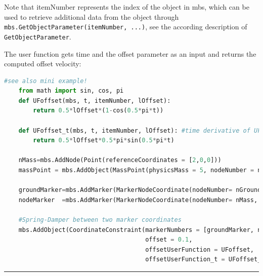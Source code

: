     Note that itemNumber represents the index of the object in mbs, which can be used to retrieve additional data from the object through
    \texttt{mbs.GetObjectParameter(itemNumber, ...)}, see the according description of \texttt{GetObjectParameter}.

    The user function gets time and the offset parameter as an input and returns the computed offset velocity:
    \finishTable
%
    \userFunctionExample{}
    \pythonstyle
    \begin{lstlisting}[language=Python]
    #see also mini example!
    from math import sin, cos, pi
    def UFoffset(mbs, t, itemNumber, lOffset): 
        return 0.5*lOffset*(1-cos(0.5*pi*t))
    
    def UFoffset_t(mbs, t, itemNumber, lOffset): #time derivative of UFoffset
        return 0.5*lOffset*0.5*pi*sin(0.5*pi*t)

    nMass=mbs.AddNode(Point(referenceCoordinates = [2,0,0]))
    massPoint = mbs.AddObject(MassPoint(physicsMass = 5, nodeNumber = nMass))
    
    groundMarker=mbs.AddMarker(MarkerNodeCoordinate(nodeNumber= nGround, coordinate = 0))
    nodeMarker  =mbs.AddMarker(MarkerNodeCoordinate(nodeNumber= nMass, coordinate = 0))
    
    #Spring-Damper between two marker coordinates
    mbs.AddObject(CoordinateConstraint(markerNumbers = [groundMarker, nodeMarker], 
                                       offset = 0.1, 
                                       offsetUserFunction = UFoffset, 
                                       offsetUserFunction_t = UFoffset_t)) 
    \end{lstlisting}
\vspace{6pt}\par\noindent\rule{\textwidth}{0.4pt}
\label{miniExample_ObjectConnectorCoordinate}
